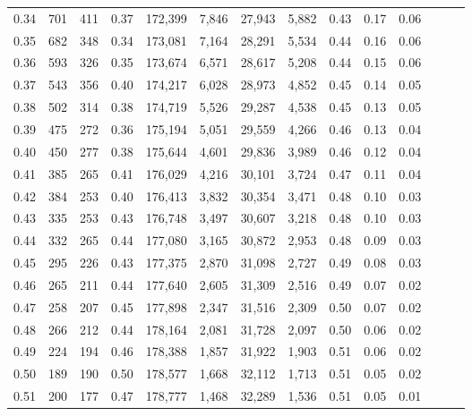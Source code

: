 \begin{tabular}{rrrrrrrrrrrrrr}
0.34 &     701 &    411 &  0.37 &  172,399 &    7,846 &  27,943 &   5,882 &  0.43 &  0.17 &      0.06 \\
0.35 &     682 &    348 &  0.34 &  173,081 &    7,164 &  28,291 &   5,534 &  0.44 &  0.16 &      0.06 \\
0.36 &     593 &    326 &  0.35 &  173,674 &    6,571 &  28,617 &   5,208 &  0.44 &  0.15 &      0.06 \\
0.37 &     543 &    356 &  0.40 &  174,217 &    6,028 &  28,973 &   4,852 &  0.45 &  0.14 &      0.05 \\
0.38 &     502 &    314 &  0.38 &  174,719 &    5,526 &  29,287 &   4,538 &  0.45 &  0.13 &      0.05 \\
0.39 &     475 &    272 &  0.36 &  175,194 &    5,051 &  29,559 &   4,266 &  0.46 &  0.13 &      0.04 \\
0.40 &     450 &    277 &  0.38 &  175,644 &    4,601 &  29,836 &   3,989 &  0.46 &  0.12 &      0.04 \\
0.41 &     385 &    265 &  0.41 &  176,029 &    4,216 &  30,101 &   3,724 &  0.47 &  0.11 &      0.04 \\
0.42 &     384 &    253 &  0.40 &  176,413 &    3,832 &  30,354 &   3,471 &  0.48 &  0.10 &      0.03 \\
0.43 &     335 &    253 &  0.43 &  176,748 &    3,497 &  30,607 &   3,218 &  0.48 &  0.10 &      0.03 \\
0.44 &     332 &    265 &  0.44 &  177,080 &    3,165 &  30,872 &   2,953 &  0.48 &  0.09 &      0.03 \\
0.45 &     295 &    226 &  0.43 &  177,375 &    2,870 &  31,098 &   2,727 &  0.49 &  0.08 &      0.03 \\
0.46 &     265 &    211 &  0.44 &  177,640 &    2,605 &  31,309 &   2,516 &  0.49 &  0.07 &      0.02 \\
0.47 &     258 &    207 &  0.45 &  177,898 &    2,347 &  31,516 &   2,309 &  0.50 &  0.07 &      0.02 \\
0.48 &     266 &    212 &  0.44 &  178,164 &    2,081 &  31,728 &   2,097 &  0.50 &  0.06 &      0.02 \\
0.49 &     224 &    194 &  0.46 &  178,388 &    1,857 &  31,922 &   1,903 &  0.51 &  0.06 &      0.02 \\
0.50 &     189 &    190 &  0.50 &  178,577 &    1,668 &  32,112 &   1,713 &  0.51 &  0.05 &      0.02 \\
0.51 &     200 &    177 &  0.47 &  178,777 &    1,468 &  32,289 &   1,536 &  0.51 &  0.05 &      0.01 \\

\end{tabular}
